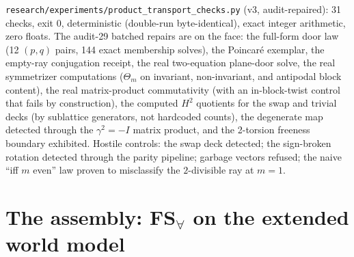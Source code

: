 \documentclass[11pt]{article}
\begin{document}
\texttt{research/experiments/product\_transport\_checks.py} (v3,
audit-repaired): 31 checks, exit 0, deterministic (double-run
byte-identical), exact integer arithmetic, zero floats. The audit-29
batched repairs are on the face: the full-form door law
(12 $(p,q)$ pairs, 144 exact membership solves), the Poincaré exemplar,
the empty-ray conjugation receipt, the real two-equation plane-door solve,
the real symmetrizer computations ($\Theta_m$ on invariant, non-invariant,
and antipodal block content), the real matrix-product commutativity (with
an in-block-twist control that fails by construction), the computed $H^2$
quotients for the swap and trivial decks (by sublattice generators, not
hardcoded counts), the degenerate map detected through the $\gamma^2=-I$
matrix product, and the 2-torsion freeness boundary exhibited. Hostile
controls: the swap deck detected; the sign-broken rotation detected
through the parity pipeline; garbage vectors refused; the naive ``iff
$m$ even'' law proven to misclassify the $2$-divisible ray at $m=1$.

\section{The assembly: FS$_\forall$ on the extended world model}
\label{sec:assembly}
\end{document}
